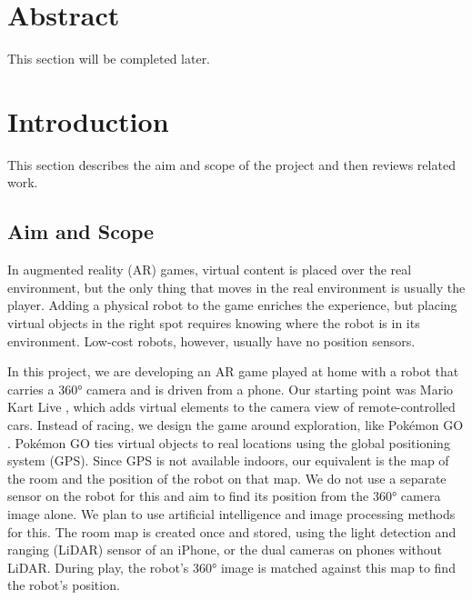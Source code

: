 \documentclass[11pt,a4paper]{article}
\begin{document}
\vspace{1cm}

\section*{Abstract}
This section will be completed later.

\newpage
\tableofcontents
\newpage
\listoffigures
\listoftables
\newpage

\setcounter{page}{1}

\section{Introduction}
\label{sec:giris}
This section describes the aim and scope of the project and then reviews related work.

\subsection{Aim and Scope}
\label{subsec:amac_kapsam}
In augmented reality (AR) games, virtual content is placed over the real environment, but the only thing that moves in the real environment is usually the player. Adding a physical robot to the game enriches the experience, but placing virtual objects in the right spot requires knowing where the robot is in its environment. Low-cost robots, however, usually have no position sensors.

In this project, we are developing an AR game played at home with a robot that carries a 360° camera and is driven from a phone. Our starting point was Mario Kart Live \cite{mariokartlive2020}, which adds virtual elements to the camera view of remote-controlled cars. Instead of racing, we design the game around exploration, like Pokémon GO \cite{paavilainen2017pokemon}. Pokémon GO ties virtual objects to real locations using the global positioning system (GPS). Since GPS is not available indoors, our equivalent is the map of the room and the position of the robot on that map. We do not use a separate sensor on the robot for this and aim to find its position from the 360° camera image alone. We plan to use artificial intelligence and image processing methods for this. The room map is created once and stored, using the light detection and ranging (LiDAR) sensor of an iPhone, or the dual cameras on phones without LiDAR. During play, the robot's 360° image is matched against this map to find the robot's position.
\end{document}
